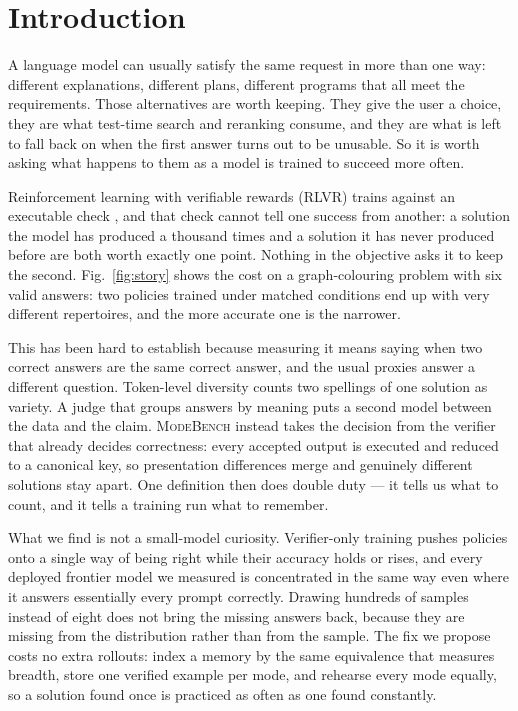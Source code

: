 \documentclass{article}
\newcommand{\1}{\mathbf 1}
\newcommand{\mb}{\textsc{ModeBench}}
\theoremstyle{remark}
\theoremstyle{definition}
\theoremstyle{plain}
\begin{document}
\section{Introduction}
\label{sec:introduction}

A language model can usually satisfy the same request in more than one way:
different explanations, different plans, different programs that all meet the
requirements. Those alternatives are worth keeping. They give the user a choice,
they are what test-time search and reranking consume, and they are what is left
to fall back on when the first answer turns out to be unusable. So it is worth
asking what happens to them as a model is trained to succeed more often.

Reinforcement learning with verifiable rewards (RLVR) trains against an
executable check \citep{guo2025deepseekr1}, and that check cannot tell one
success from another: a solution the model has produced a thousand times and a
solution it has never produced before are both worth exactly one point. Nothing
in the objective asks it to keep the second. Fig.~\ref{fig:story} shows the cost
on a graph-colouring problem with six valid answers: two policies trained under
matched conditions end up with very different repertoires, and the more accurate
one is the narrower.

This has been hard to establish because measuring it means saying when two
correct answers are the same correct answer, and the usual proxies answer a
different question. Token-level diversity counts two spellings of one solution
as variety. A judge that groups answers by meaning puts a second model between
the data and the claim. \mb{} instead takes the decision from the verifier that
already decides correctness: every accepted output is executed and reduced to a
canonical key, so presentation differences merge and genuinely different
solutions stay apart. One definition then does double duty --- it tells us what
to count, and it tells a training run what to remember.

What we find is not a small-model curiosity. Verifier-only training pushes
policies onto a single way of being right while their accuracy holds or rises,
and every deployed frontier model we measured is concentrated in the same way
even where it answers essentially every prompt correctly. Drawing hundreds of
samples instead of eight does not bring the missing answers back, because they
are missing from the distribution rather than from the sample. The fix we
propose costs no extra rollouts: index a memory by the same equivalence that
measures breadth, store one verified example per mode, and rehearse every mode
equally, so a solution found once is practiced as often as one found constantly.
\end{document}
